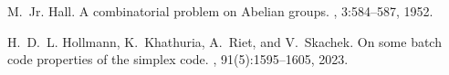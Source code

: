 M.~Jr. Hall.
\newblock A combinatorial problem on {Abelian} groups.
, 3:584--587, 1952.

H.~D.~L. Hollmann, K.~Khathuria, A.~Riet, and V.~Skachek.
\newblock On some batch code properties of the simplex code.
, 91(5):1595--1605, 2023.
